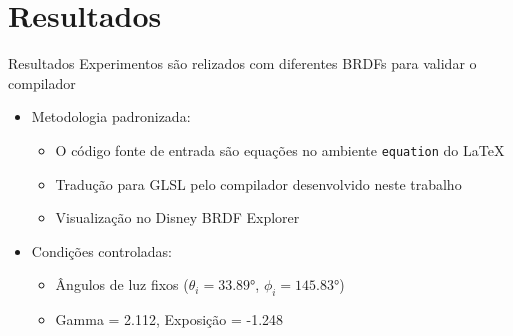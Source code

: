 \section{Resultados}

\begin{frame}{Resultados}
    Experimentos são relizados com diferentes BRDFs para validar o compilador
   \begin{itemize}
       \item Metodologia padronizada:
             \begin{itemize}
                 \item O código fonte de entrada são equações no ambiente \texttt{equation} do \LaTeX{}
                 \item Tradução para GLSL pelo compilador desenvolvido neste trabalho
                 \item Visualização no Disney BRDF Explorer
             \end{itemize}
       \item Condições controladas:
             \begin{itemize}
                 \item Ângulos de luz fixos ($\theta_i = 33.89°$, $\phi_i = 145.83°$)
                 \item Gamma = 2.112, Exposição = -1.248
             \end{itemize}
   \end{itemize}
\end{frame}

